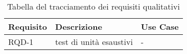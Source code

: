 \renewcommand{\arraystretch}{1.8} %
\begin{table}%
  \begin{tabularx}{\textwidth}{|l|X|l|}
    \hline
    \textbf{Requisito} & \textbf{Descrizione}    & \textbf{Use Case} \\
    \hline
    RQD-1              & test di unità esaustivi & -                 \\
    \hline
  \end{tabularx}
  \\
  \label{tab:requisiti-qualitativi}
  \caption{Tabella del tracciamento dei requisiti qualitativi}
\end{table}%